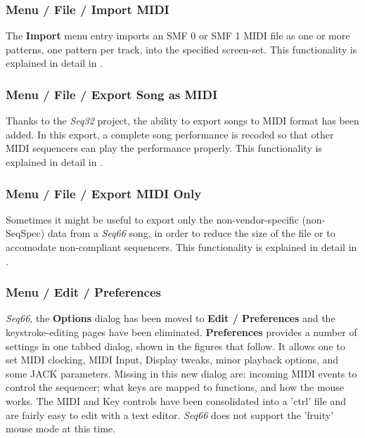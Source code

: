 \subsubsection{Menu / File / Import MIDI}
\label{subsubsec:seq66_menu_file_import}

   The \textbf{Import} menu entry imports an SMF 0
   or SMF 1 MIDI file as one or more patterns, one pattern per track,
   into the specified screen-set.
   This functionality is explained in detail in
   .

\subsubsection{Menu / File / Export Song as MIDI}
\label{subsubsec:seq66_menu_file_export}

   Thanks to the \textsl{Seq32} project, the ability to export songs to MIDI
   format has been added.  In this export, a complete song performance is
   recoded so that other MIDI sequencers can play the performance properly.
   This functionality is explained in detail in
   .

\subsubsection{Menu / File / Export MIDI Only}
\label{subsubsec:seq66_menu_file_export_midi_only}

   Sometimes it might be useful to export only the non-vendor-specific
   (non-SeqSpec) data from a \textsl{Seq66} song, in order to reduce the
   size of the file or to accomodate non-compliant sequencers.
   This functionality is explained in detail in
   .

\subsubsection{Menu / Edit / Preferences}
\label{subsubsec:seq66_menu_edit_preferences}

   \textsl{Seq66}, the \textbf{Options} dialog has been moved to 
   \textbf{Edit / Preferences} and the keystroke-editing pages have been eliminated.
   \textbf{Preferences} provides a number of settings in one
   tabbed dialog, shown in the figures that follow.
   It allows one to set MIDI clocking, MIDI Input, Display tweaks, minor playback
   options, and some JACK parameters.
   Missing in this new dialog are: incoming MIDI events to control the sequencer;
   what keys are mapped to functions, and how the mouse works.
   The MIDI and Key controls have been consolidated into a 'ctrl' file and are
   fairly easy to edit with a text editor.
   \textsl{Seq66} does not support the 'fruity' mouse mode at this time.

